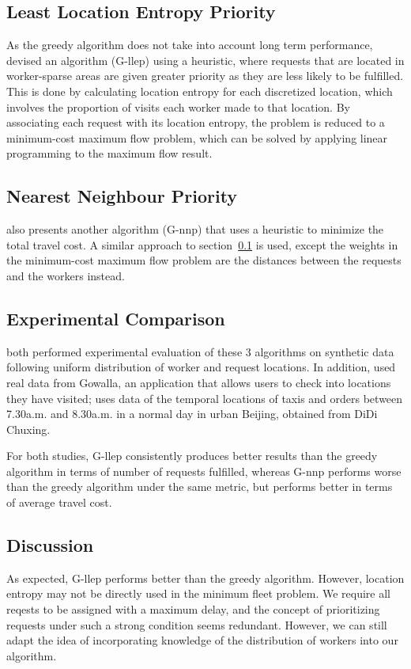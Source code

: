 \documentclass[urop]{socreport}
\begin{document}
\subsection{Least Location Entropy Priority}
\label{llep}
As the greedy algorithm does not take into account long term performance, \cite{kazemi} devised an algorithm (G-llep) using a heuristic, where requests that are located in worker-sparse areas are given greater priority as they are less likely to be fulfilled. This is done by calculating location entropy for each discretized location, which involves the proportion of visits each worker made to that location. By associating each request with its location entropy, the problem is reduced to a minimum-cost maximum flow problem, which can be solved by applying linear programming to the maximum flow result.

\subsection{Nearest Neighbour Priority}
\cite{kazemi} also presents another algorithm (G-nnp) that uses a heuristic to minimize the total travel cost. A similar approach to section~\ref{llep} is used, except the weights in the minimum-cost maximum flow problem are the distances between the requests and the workers instead.
\label{nnp}

\subsection{Experimental Comparison}
\cite{kazemi,cheng} both performed experimental evaluation of these 3 algorithms on synthetic data following uniform distribution of worker and request locations. In addition, \cite{kazemi} used real data from Gowalla, an application that allows users to check into locations they have visited; \cite{cheng} uses data of the temporal locations of taxis and orders between 7.30a.m. and 8.30a.m. in a normal day in urban Beijing, obtained from DiDi Chuxing.

For both studies, G-llep consistently produces better results than the greedy algorithm in terms of number of requests fulfilled, whereas G-nnp performs worse than the greedy algorithm under the same metric, but performs better in terms of average travel cost.  
\label{nnpexp}

\subsection{Discussion}
\label{discussion}
As expected, G-llep performs better than the greedy algorithm. However, location entropy may not be directly used in the minimum fleet problem. We require all reqests to be assigned with a maximum delay, and the concept of prioritizing requests under such a strong condition seems redundant. However, we can still adapt the idea of incorporating knowledge of the distribution of workers into our algorithm.
\end{document}

